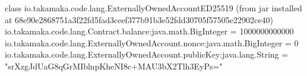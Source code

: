 \begin{shellbox}\begin{ttlst}
class io.takamaka.code.lang.ExternallyOwnedAccountED25519 (from jar installed at 68e90e2868751a3f22fd5fad3ceef377b91b3e52fdd30705f57505e22902ce40)
  io.takamaka.code.lang.Contract.balance:java.math.BigInteger = 1000000000000
  io.takamaka.code.lang.ExternallyOwnedAccount.nonce:java.math.BigInteger = 0
  io.takamaka.code.lang.ExternallyOwnedAccount.publicKey:java.lang.String = "srXzgJdUaG8qGrMIblnpKheNI8c+MAU3bX2Tlh3EyPs="
\end{ttlst}\end{shellbox}
